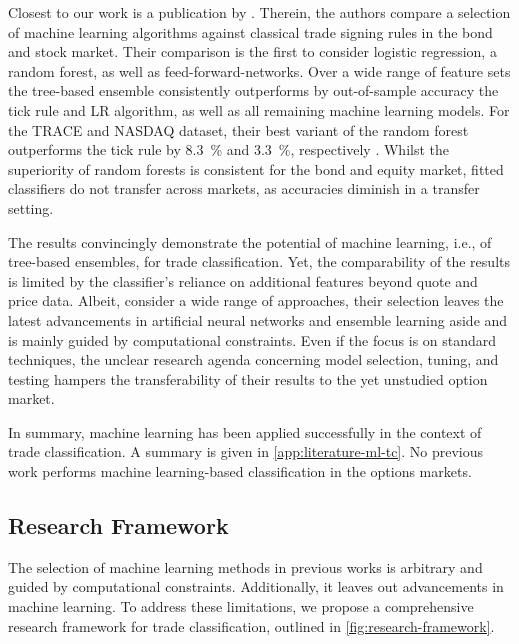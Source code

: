 Closest to our work is a publication by \textcite[1--58]{ronenMachineLearningTrade2022}. Therein, the authors compare a selection of machine learning algorithms against classical trade signing rules in the bond and stock market. Their comparison is the first to consider logistic regression, a random forest, as well as \glspl{feed-forward-network}. Over a wide range of feature sets the tree-based ensemble consistently outperforms by out-of-sample accuracy the tick rule and \gls{LR} algorithm, as well as all remaining machine learning models. For the \gls{TRACE} and \gls{NASDAQ} dataset, their best variant of the random forest outperforms the tick rule by \SI{8.3}{\percent} and \SI{3.3}{\percent}, respectively \autocite[57]{ronenMachineLearningTrade2022}. Whilst the superiority of random forests is consistent for the bond and equity market, fitted classifiers do not transfer across markets, as accuracies diminish in a transfer setting.

The results convincingly demonstrate the potential of machine learning, i.e., of tree-based ensembles, for trade classification. Yet, the comparability of the results is limited by the classifier's reliance on additional features beyond quote and price data. Albeit, \textcite[13--14]{ronenMachineLearningTrade2022} consider a wide range of approaches, their selection leaves the latest advancements in artificial neural networks and ensemble learning aside and is mainly guided by computational constraints. Even if the focus is on standard techniques, the unclear research agenda concerning model selection, tuning, and testing hampers the transferability of their results to the yet unstudied option market.

In summary, machine learning has been applied successfully in the context of trade classification. A summary is given in \cref{app:literature-ml-tc}.  No previous work performs machine learning-based classification in the options markets.



\subsection{Research Framework}\label{sec:research-framework}

The selection of machine learning methods in previous works is arbitrary and guided by computational constraints. Additionally, it leaves out advancements in machine learning. To address these limitations, we propose a comprehensive research framework for trade classification, outlined in \cref{fig:research-framework}. 

